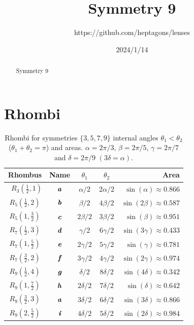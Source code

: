 \documentclass[11pt]{article}
\title{Symmetry 9}
\author{https://github.com/heptagons/lenses}
\date{2024/1/14}
\def\mathbi#1{\textbf{\em #1}}
\begin{document}
\maketitle
\begin{abstract}
Symmetry 9
\end{abstract}

\section{Rhombi}

\begin{table}[H]
\begin{center}
\begin{tabular}{|c|c|c c| r |}
\hline
Rhombus & Name & $\theta_1$ & $\theta_2$ & Area \\ \hline\
$R_3(\frac{1}2,1)$ & $\mathbi{a}$ & $\alpha/2$ & $2\alpha/2$  & $\sin(\alpha) \approx 0.866$ \\[0.5ex]
\hline
$R_5(\frac{1}2,2)$ & $\mathbi{b}$ & $\beta/2$  & $4\beta/2$   & $\sin(2\beta) \approx 0.587$\\[0.5ex]
$R_5(1,\frac{3}2)$ & $\mathbi{c}$ & $2\beta/2$ & $3\beta/2$   & $\sin(\beta) \approx 0.951$\\[0.5ex]
\hline
$R_7(\frac{1}2,3)$ & $\mathbi{d}$ & $\gamma/2$ & $6\gamma/2$  & $\sin(3\gamma) \approx 0.433$\\[0.5ex]
$R_7(1,\frac{5}2)$ & $\mathbi{e}$ & $2\gamma/2$ & $5\gamma/2$ & $\sin(\gamma) \approx 0.781$\\[0.5ex]
$R_7(\frac{3}2,2)$ & $\mathbi{f}$ & $3\gamma/2$ & $4\gamma/2$ & $\sin(2\gamma) \approx 0.974$\\[0.5ex]
\hline
$R_9(\frac{1}2,4)$ & $\mathbi{g}$ & $\delta/2$ & $8\delta/2$  & $\sin(4\delta) \approx 0.342$\\[0.5ex]
$R_9(1,\frac{7}2)$ & $\mathbi{h}$ & $2\delta/2$ & $7\delta/2$ & $\sin(\delta) \approx 0.642$\\[0.5ex]
$R_9(\frac{3}2,3)$ & $\mathbi{a}$ & $3\delta/2$ & $6\delta/2$ & $\sin(3\delta) \approx 0.866$\\[0.5ex]
$R_9(2,\frac{5}2)$ & $\mathbi{i}$ & $4\delta/2$ & $5\delta/2$ & $\sin(2\delta) \approx 0.984$\\[0.5ex]
\hline
\end{tabular}
\caption{Rhombi for symmetries $\{3,5,7,9\}$ internal angles $\theta_1 < \theta_2$ ($\theta_1 + \theta_2 = \pi$) and areas. $\alpha = 2\pi/3$, $\beta = 2\pi/5$, $\gamma = 2\pi/7$ and $\delta = 2\pi/9$ $(3\delta = \alpha)$.} 
\label{tbl:rhombi}
\end{center}
\end{table}
\end{document}

